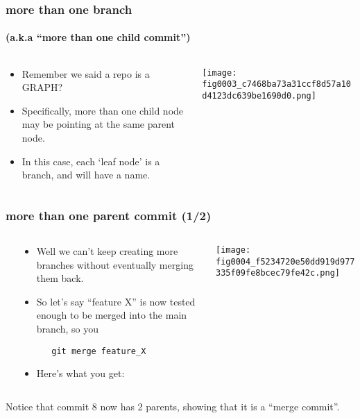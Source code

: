 \documentclass[presentation]{beamer}
\begin{document}
\begin{frame}
\frametitle{more than one branch}
\framesubtitle{(a.k.a ``more than one child commit'')}
\label{sec-3-2}
\begin{columns}
\begin{column}{0.6\textwidth}
\label{sec-3-2-1}

\begin{itemize}
\item Remember we said a repo is a GRAPH?
\item Specifically, more than one child node
  may be pointing at the same parent node.
\item In this case, each `leaf node' is a
  branch, and will have a name.
\end{itemize}
\end{column}
\begin{column}{0.4\textwidth}
\label{sec-3-2-2}




\texttt{[image: fig0003\_c7468ba73a31ccf8d57a10d4123dc639be1690d0.png]}
\end{column}
\end{columns}
\end{frame}
\begin{frame}[fragile]
\frametitle{more than one parent commit (1/2)}
\label{sec-3-3}
\begin{columns} %
\label{sec-3-3-1}
\begin{column}{0.6\textwidth}
\label{sec-3-3-1-1}

\begin{itemize}
\item Well we can't keep creating more branches without eventually merging them
  back.
\item So let's say ``feature X'' is now tested enough to be merged into the
  main branch, so you 

\begin{verbatim}
   git merge feature_X
\end{verbatim}
\item Here's what you get:
\end{itemize}
\end{column}
\begin{column}{0.4\textwidth}
\label{sec-3-3-1-2}




\texttt{[image: fig0004\_f5234720e50dd919d977335f09fe8bcec79fe42c.png]}
\end{column}
\end{columns}
\label{sec-3-3-2}


\tiny
Notice that commit 8 now has 2 parents, showing that it is a ``merge commit''.
\end{frame}
\end{document}
